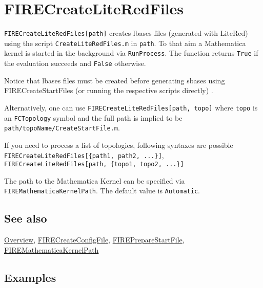 \documentclass[../FeynHelpersManual.tex]{subfiles}
\begin{document}
\begin{Shaded}
\begin{Highlighting}[]
 
\end{Highlighting}
\end{Shaded}

\hypertarget{firecreateliteredfiles}{
\section{FIRECreateLiteRedFiles}\label{firecreateliteredfiles}}

\texttt{FIRECreateLiteRedFiles[\allowbreak{}path]} creates lbases files
(generated with LiteRed) using the script \texttt{CreateLiteRedFiles.m}
in \texttt{path}. To that aim a Mathematica kernel is started in the
background via \texttt{RunProcess}. The function returns \texttt{True}
if the evaluation succeeds and \texttt{False} otherwise.

Notice that lbases files must be created before generating sbases using
FIRECreateStartFiles (or running the respective scripts directly) .

Alternatively, one can use
\texttt{FIRECreateLiteRedFiles[\allowbreak{}path,\ \allowbreak{}topo]}
where \texttt{topo} is an \texttt{FCTopology} symbol and the full path
is implied to be \texttt{path/topoName/CreateStartFile.m}.

If you need to process a list of topologies, following syntaxes are
possible
\texttt{FIRECreateLiteRedFiles[\allowbreak{}\{\allowbreak{}path1,\ \allowbreak{}path2,\ \allowbreak{}...\}]},
\texttt{FIRECreateLiteRedFiles[\allowbreak{}path,\ \allowbreak{}\{\allowbreak{}topo1,\ \allowbreak{}topo2,\ \allowbreak{}...\}]}

The path to the Mathematica Kernel can be specified via
\texttt{FIREMathematicaKernelPath}. The default value is
\texttt{Automatic}.

\subsection{See also}

\hyperlink{toc}{Overview},
\hyperlink{firecreateconfigfile}{FIRECreateConfigFile},
\hyperlink{firepreparestartfile}{FIREPrepareStartFile},
\hyperlink{firemathematicakernelpath}{FIREMathematicaKernelPath}

\subsection{Examples}
\end{document}
